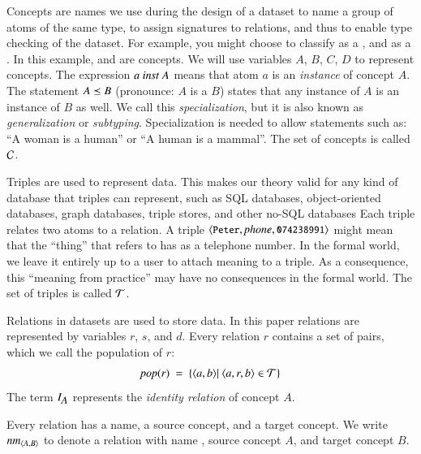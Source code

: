 \documentclass{elsarticle}
\begin{document}
	Concepts are names we use during the design of a dataset
	to name a group of atoms of the same type,
	to assign signatures to relations, and thus
	to enable type checking of the dataset.
	For example, you might choose to classify  as a , and  as a .
	In this example,  and  are concepts.
    We will use variables $A$, $B$, $C$, $D$ to represent concepts.
	The expression $a\ \inst\ A$ means that atom $a$ is an \emph{instance} of concept $A$.
	The statement $A\preceq B$ (pronounce: $A$ is a $B$) states that any instance of $A$ is an instance of $B$ as well.
	We call this {\em specialization}, but it is also known as {\em generalization} or {\em subtyping}.
	Specialization is needed to allow statements such as: ``A woman is a human'' or ``A human is a mammal''.
	The set of concepts is called $\mathcal{C}$.
	
	Triples are used to represent data.
	This makes our theory valid for any kind of database that triples can represent,
	such as SQL databases, object-oriented databases, graph databases, triple stores, and other no-SQL databases
	Each triple relates two atoms to a relation.
	A triple $\langle{\text{{\tt\small Peter}}},{\text{\it phone\/}},{\text{{\tt\small 074238991}}}\rangle$ might mean that the ``thing'' that  refers to
	has  as a telephone number.
	In the formal world, we leave it entirely up to a user to attach meaning to a triple.
	As a consequence, this ``meaning from practice'' may have no consequences in the formal world.
	The set of triples is called $\mathcal{T}$.

	Relations in datasets are used to store data.
	In this paper relations are represented by variables $r$, $s$, and $d$.
	Every relation $r$ contains a set of pairs, which we call the population of $r$:
\begin{equation}
	\pop{r}\ =\ \{ \pair{a}{b}|\ \triple{a}{r}{b}\in\triples\}
\end{equation}
	The term $I_{\text{\it \small A\/}}$ represents the \emph{identity relation} of concept $A$.

	Every relation has a name, a source concept, and a target concept.
	We write $\text{\it nm\/}_{\langle{A},{B}\rangle}$ to denote a relation with name , source concept $A$, and target concept $B$.
\end{document}
